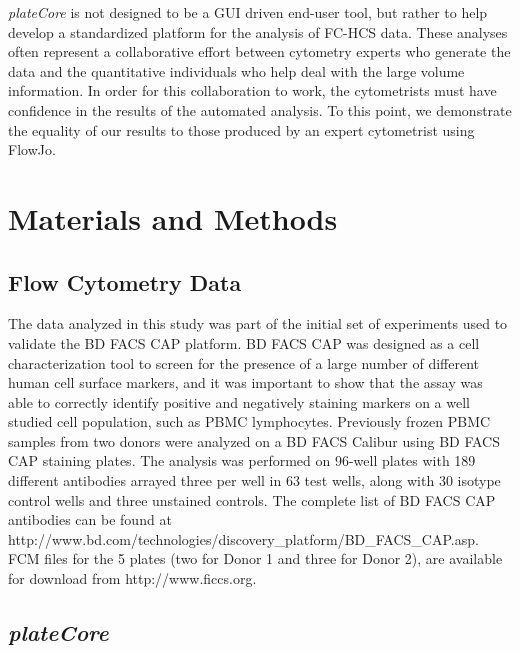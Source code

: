 \documentclass[12pt]{article}
\newcommand{\Rpackage}[1]{{\textit{#1}}}
\begin{document}
\Rpackage{plateCore} is not designed to be a GUI driven end-user tool, but
rather to help develop a standardized platform for the analysis of FC-HCS data.
These analyses often represent a collaborative effort between cytometry experts
who generate the data and the quantitative individuals who help deal with the
large volume information. In order for this collaboration to work, the
cytometrists must have confidence in the results of the automated analysis. To
this point, we demonstrate the equality of our results to those produced by an
expert cytometrist using FlowJo.

\clearpage
\section*{Materials and Methods}
\subsection*{Flow Cytometry Data}

The data analyzed in this study was part of the initial set of experiments
used to validate the BD FACS CAP platform. BD FACS CAP was designed as a cell
characterization tool to screen for the presence of a large number of different
human cell surface markers, and it was important to show that the assay was
able to correctly identify positive and negatively staining markers on a well
studied cell population, such as PBMC lymphocytes. Previously
frozen PBMC samples from two donors were analyzed on a BD FACS Calibur using BD
FACS CAP staining plates. The analysis was performed on 96-well plates with 189
different antibodies arrayed three per well in 63 test wells, along with 30
isotype control wells and three unstained controls. The complete list of BD
FACS CAP antibodies can be found at
http://www.bd.com/technologies/discovery\_platform/BD\_FACS\_CAP.asp. FCM files
for the 5 plates (two for Donor 1 and three for Donor 2), are available for
download from http://www.ficcs.org.

\subsection*{\Rpackage{plateCore}}
\end{document}
